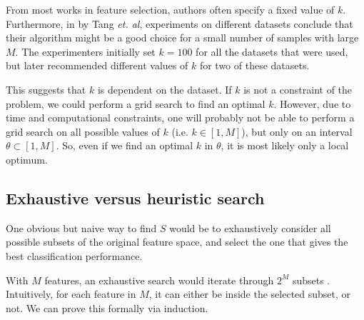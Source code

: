 \documentclass[12pt, twoside, a4paper]{report}
\begin{document}
From most works in feature selection, authors often specify a fixed value of $k$. Furthermore, in \cite{RefWorks:119} by Tang \textit{et. al}, experiments on different datasets conclude that their algorithm might be a good choice for a small number of samples with large $M$. The experimenters initially set $k=100$ for all the datasets that were used, but later recommended different values of $k$ for two of these datasets.

This suggests that $k$ is dependent on the dataset. If $k$ is not a constraint of the problem, we could perform a grid search to find an optimal $k$. However, due to time and computational constraints, one will probably not be able to perform a grid search on all possible values of $k$ (i.e. $k \in [1, M]$), but only on an interval $\theta \subset [1, M]$. So, even if we find an optimal $k$ in $\theta$, it is most likely only a local optimum.


\subsection{Exhaustive versus heuristic search} \label{bg:fs:exhaustive}

One obvious but naive way to find $S$ would be to exhaustively consider all possible subsets of the original feature space, and select the one that gives the best classification performance.

With $M$ features, an exhaustive search would iterate through $2^M$ subsets \cite{RefWorks:182}. Intuitively, for each feature in $M$, it can either be inside the selected subset, or not. We can prove this formally via induction.
\end{document}
